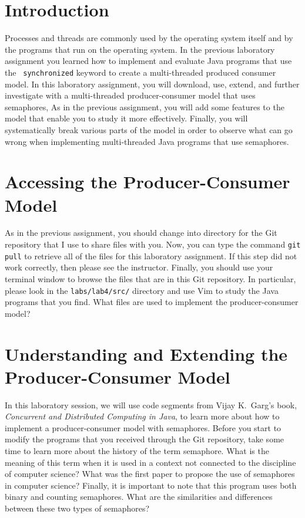 


\usepackage[compact]{titlesec}


\section*{Introduction}

Processes and threads are commonly used by the operating system itself and by the programs that run on the operating
system. In the previous laboratory assignment you learned how to implement and evaluate Java programs that use the {\tt
synchronized} keyword to create a multi-threaded produced consumer model. In this laboratory assignment, you will
download, use, extend, and further investigate with a multi-threaded producer-consumer model that uses semaphores,  As
in the previous assignment, you will add some features to the model that enable you to study it more effectively.
Finally, you will systematically break various parts of the model in order to observe what can go wrong when
implementing multi-threaded Java programs that use semaphores.

\section*{Accessing the Producer-Consumer Model}

As in the previous assignment, you should change into directory for the Git repository that I use to share files with
you. Now, you can type the command {\tt git pull} to retrieve all of the files for this laboratory assignment. If this
step did not work correctly, then please see the instructor.  Finally, you should use your terminal window to browse
the files that are in this Git repository.  In particular, please look in the {\tt labs/lab4/src/} directory and use Vim
to study the Java programs that you find. What files are used to implement the producer-consumer model?

\section*{Understanding and Extending the Producer-Consumer Model}

In this laboratory session, we will use code segments from Vijay K.\ Garg's book, {\em Concurrent and Distributed
  Computing in Java}, to learn more about how to implement a producer-consumer model with semaphores.  Before you start
to modify the programs that you received through the Git repository, take some time to learn more about the history of
the term semaphore.  What is the meaning of this term when it is used in a context not connected to the discipline of
computer science? What was the first paper to propose the use of semaphores in computer science? Finally, it is
important to note that this program uses both binary and counting semaphores. What are the similarities and differences
between these two types of semaphores?

